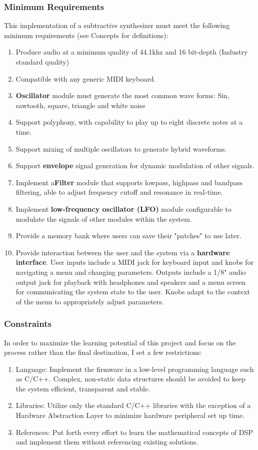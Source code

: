 \documentclass[acmlarge,screen]{acmart}
\begin{document}
	\subsubsection{Minimum Requirements}
	\label{requirements}
	This implementation of a subtractive synthesizer must meet the following minimum requirements (see Concepts for definitions):
	\begin{enumerate}
		\item Produce audio at a minimum quality of 44.1khz and 16 bit-depth (Industry standard quality)
		\item Compatible with any generic MIDI keyboard.
		\item \textbf{Oscillator} module must generate the most common wave forms: Sin, sawtooth, square, triangle and white noise
		\item Support polyphony, with capability to play up to eight discrete notes at a time.
		\item Support mixing of multiple oscillators to generate hybrid waveforms.
		\item Support \textbf{envelope} signal generation for dynamic modulation of other signals.
		\item Implement a\textbf{Filter} module that supports lowpass, highpass and bandpass filtering, able to adjust frequency cutoff and resonance in real-time.
		\item Implement \textbf{low-frequency oscillator (LFO)} module configurable to modulate the signals of other modules within the system.
		\item Provide a memory bank where users can save their "patches" to use later.
		\item Provide interaction between the user and the system via a \textbf{hardware interface}. User inputs include a MIDI jack for keyboard input and knobs for navigating a menu and changing parameters. Outputs include a 1/8" audio output jack for playback with headphones and speakers and a menu screen for communicating the system state to the user. Knobs adapt to the context of the menu to appropriately adjust parameters.
	\end{enumerate}
	
	\subsubsection{Constraints}
	In order to maximize the learning potential of this project and focus on the process rather than the final destination, I set a few restrictions:
	\begin{enumerate}
		\item Language: Implement the firmware in a low-level programming language such as C/C++. Complex, non-static data structures should be avoided to keep the system efficient, transparent and stable.
		\item Libraries: Utilize only the standard C/C++ libraries with the exception of a Hardware Abstraction Layer to minimize hardware peripheral set up time. 
		\item References: Put forth every effort to learn the mathematical concepts of DSP and implement them without referencing existing solutions.
	\end{enumerate}
	
\end{document}
